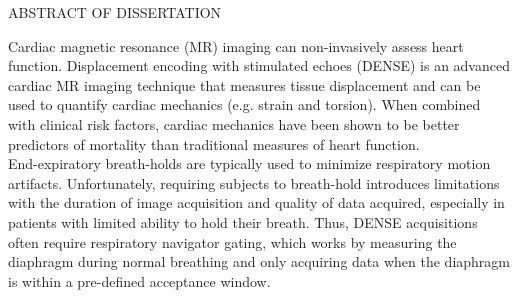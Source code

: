 
\thispagestyle{empty} %

\newcommand*{\SignatureAndDate}[2]{%
	\par\hfill\noindent\makebox[2.5in]{#1}
	\vspace{-0.15in}
	\par\hfill\noindent\makebox[2.5in]{\hrulefill}
	\par\hfill\makebox[2.5in][c]{}
	\vspace{0.05in}
	\par\hfill\noindent\makebox[2.5in]{#2}
	\vspace{-0.15in}
	\par\hfill\noindent\makebox[2.5in]{\hrulefill}
	\vspace{-0.05in}
	\par\hfill\noindent\makebox[2.5in][c]{Date}
}%

\begin{center}
	ABSTRACT OF DISSERTATION\\
	\vspace{0.5in}
	\makeatletter
	\@title
	\makeatother
\end{center}

Cardiac magnetic resonance (MR) imaging can non-invasively assess heart function. Displacement encoding with stimulated echoes (DENSE) is an advanced cardiac MR imaging technique that measures tissue displacement and can be used to quantify cardiac mechanics (e.g. strain and torsion). When combined with clinical risk factors, cardiac mechanics have been shown to be better predictors of mortality than traditional measures of heart function.\\

End-expiratory breath-holds are typically used to minimize respiratory motion artifacts. Unfortunately, requiring subjects to breath-hold introduces limitations with the duration of image acquisition and quality of data acquired, especially in patients with limited ability to hold their breath. Thus, DENSE acquisitions often require respiratory navigator gating, which works by measuring the diaphragm during normal breathing and only acquiring data when the diaphragm is within a pre-defined acceptance window.\\


